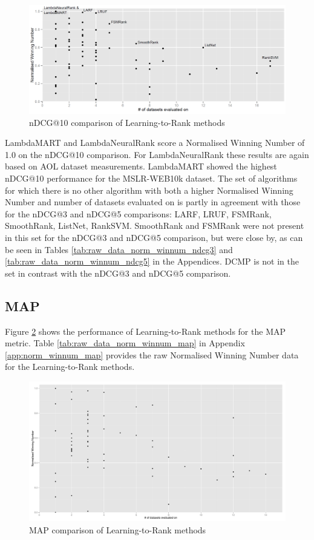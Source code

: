 \begin{figure}[!h]
\includegraphics[scale=0.285]{gfx/ndcg10_winnum}
\caption{\acs{nDCG}@10 comparison of Learning-to-Rank methods}
\label{fig:normalised_winning_number_ndcg10}
\end{figure}

LambdaMART and LambdaNeuralRank score a Normalised Winning Number of 1.0 on the \ac{nDCG}@10 comparison. For LambdaNeuralRank these results are again based on AOL dataset measurements. LambdaMART showed the highest \ac{nDCG}@10 performance for the MSLR-WEB10k dataset. The set of algorithms for which there is no other algorithm with both a higher Normalised Winning Number and number of datasets evaluated on is partly in agreement with those for the \ac{nDCG}@3 and \ac{nDCG}@5 comparisons: {LARF, LRUF, FSMRank, SmoothRank, ListNet, RankSVM}. SmoothRank and FSMRank were not present in this set for the \ac{nDCG}@3 and \ac{nDCG}@5 comparison, but were close by, as can be seen in Tables \ref{tab:raw_data_norm_winnum_ndcg3} and \ref{tab:raw_data_norm_winnum_ndcg5} in the Appendices. DCMP is not in the set in contrast with the \ac{nDCG}@3 and \ac{nDCG}@5 comparison.

\subsection{MAP}
Figure \ref{fig:normalised_winning_number_map} shows the performance of Learning-to-Rank methods for the \ac{MAP} metric. Table \ref{tab:raw_data_norm_winnum_map} in Appendix \ref{app:norm_winnum_map} provides the raw Normalised Winning Number data for the Learning-to-Rank methods.\\

\begin{figure}[!h]
\includegraphics[scale=0.285]{gfx/map_winnum}
\caption{\acs{MAP} comparison of Learning-to-Rank methods}
\label{fig:normalised_winning_number_map}
\end{figure}

